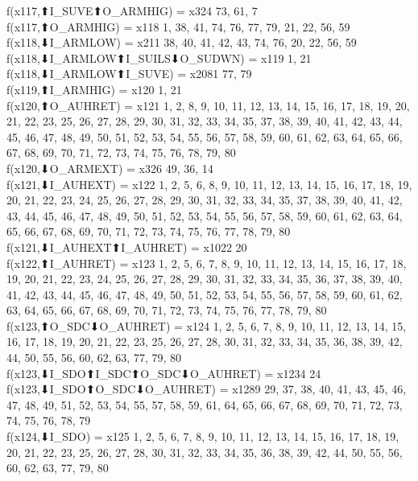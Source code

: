 f(x117,⬆I_SUVE⬆O_ARMHIG) = x324 {73, 61, 7} \\
f(x117,⬆O_ARMHIG) = x118 {1, 38, 41, 74, 76, 77, 79, 21, 22, 56, 59} \\
f(x118,⬇I_ARMLOW) = x211 {38, 40, 41, 42, 43, 74, 76, 20, 22, 56, 59} \\
f(x118,⬇I_ARMLOW⬆I_SUILS⬇O_SUDWN) = x119 {1, 21} \\
f(x118,⬇I_ARMLOW⬆I_SUVE) = x2081 {77, 79} \\
f(x119,⬆I_ARMHIG) = x120 {1, 21} \\
f(x120,⬆O_AUHRET) = x121 {1, 2, 8, 9, 10, 11, 12, 13, 14, 15, 16, 17, 18, 19, 20, 21, 22, 23, 25, 26, 27, 28, 29, 30, 31, 32, 33, 34, 35, 37, 38, 39, 40, 41, 42, 43, 44, 45, 46, 47, 48, 49, 50, 51, 52, 53, 54, 55, 56, 57, 58, 59, 60, 61, 62, 63, 64, 65, 66, 67, 68, 69, 70, 71, 72, 73, 74, 75, 76, 78, 79, 80} \\
f(x120,⬇O_ARMEXT) = x326 {49, 36, 14} \\
f(x121,⬇I_AUHEXT) = x122 {1, 2, 5, 6, 8, 9, 10, 11, 12, 13, 14, 15, 16, 17, 18, 19, 20, 21, 22, 23, 24, 25, 26, 27, 28, 29, 30, 31, 32, 33, 34, 35, 37, 38, 39, 40, 41, 42, 43, 44, 45, 46, 47, 48, 49, 50, 51, 52, 53, 54, 55, 56, 57, 58, 59, 60, 61, 62, 63, 64, 65, 66, 67, 68, 69, 70, 71, 72, 73, 74, 75, 76, 77, 78, 79, 80} \\
f(x121,⬇I_AUHEXT⬆I_AUHRET) = x1022 {20} \\
f(x122,⬆I_AUHRET) = x123 {1, 2, 5, 6, 7, 8, 9, 10, 11, 12, 13, 14, 15, 16, 17, 18, 19, 20, 21, 22, 23, 24, 25, 26, 27, 28, 29, 30, 31, 32, 33, 34, 35, 36, 37, 38, 39, 40, 41, 42, 43, 44, 45, 46, 47, 48, 49, 50, 51, 52, 53, 54, 55, 56, 57, 58, 59, 60, 61, 62, 63, 64, 65, 66, 67, 68, 69, 70, 71, 72, 73, 74, 75, 76, 77, 78, 79, 80} \\
f(x123,⬆O_SDC⬇O_AUHRET) = x124 {1, 2, 5, 6, 7, 8, 9, 10, 11, 12, 13, 14, 15, 16, 17, 18, 19, 20, 21, 22, 23, 25, 26, 27, 28, 30, 31, 32, 33, 34, 35, 36, 38, 39, 42, 44, 50, 55, 56, 60, 62, 63, 77, 79, 80} \\
f(x123,⬇I_SDO⬆I_SDC⬆O_SDC⬇O_AUHRET) = x1234 {24} \\
f(x123,⬇I_SDO⬆O_SDC⬇O_AUHRET) = x1289 {29, 37, 38, 40, 41, 43, 45, 46, 47, 48, 49, 51, 52, 53, 54, 55, 57, 58, 59, 61, 64, 65, 66, 67, 68, 69, 70, 71, 72, 73, 74, 75, 76, 78, 79} \\
f(x124,⬇I_SDO) = x125 {1, 2, 5, 6, 7, 8, 9, 10, 11, 12, 13, 14, 15, 16, 17, 18, 19, 20, 21, 22, 23, 25, 26, 27, 28, 30, 31, 32, 33, 34, 35, 36, 38, 39, 42, 44, 50, 55, 56, 60, 62, 63, 77, 79, 80} \\

